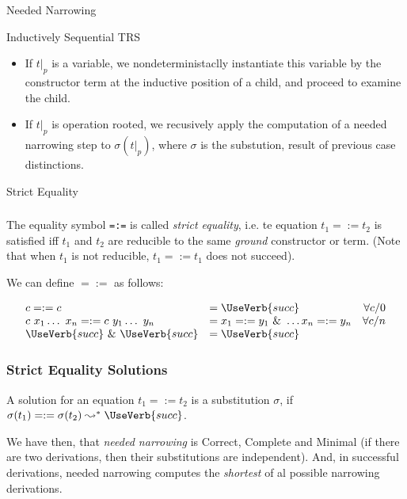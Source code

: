 \documentclass{beamer}
\begin{document}
\begin{section}{Needed Narrowing}
\begin{subsection}{Inductively Sequential TRS}
\begin{frame}
\begin{itemize}
\begin{itemize}
  \item If $t|_p$ is a variable, we nondeterministaclly instantiate this variable by the constructor term at the inductive position of a child, and proceed to examine the child.

  \item If $t|_p$ is operation rooted, we recusively apply the computation of a needed narrowing step to $\sigma(t|_p)$, where $\sigma$ is the substution, result of previous case distinctions.
  \end{itemize}
\end{itemize}

\end{frame}
\end{subsection}
\begin{subsection}{Strict Equality}
\begin{frame}[fragile]
\frametitle{\subsecname}
    The equality symbol \verb|=:=| is called \textit{strict equality}, i.e. te equation $t_1 =:= t_2$ is satisfied iff $t_1$ and $t_2$ are reducible to the same \textit{ground} constructor or term. (Note that when $t_1$ is not reducible, $t_1 =:= t_1$ does not succeed).

    We can define $=:=$ as follows:

    \[
    \begin{array}{llr}
    
      c =:= c &= \UseVerb{succ} &\forall  c/0\\
      c ~ x_1 \ldots ~ x_n =:= c ~ y_1 \ldots ~ y_n &= x_1 =:= y_1 ~\&~ \ldots x_n =:= y_n &\forall c/n \\
      \UseVerb{succ}~ \&~ \UseVerb{succ} &= \UseVerb{succ}
    \end{array}
    \]
\end{frame}

\begin{frame}[fragile]
\frametitle{Strict Equality Solutions}
A solution for an equation $t_1 =:= t_2$ is a substitution $\sigma$, if $\sigma(t_1) =:= \sigma(t_2) \leadsto^* \UseVerb{succ}$.

We have then, that \textit{needed narrowing} is Correct, Complete and Minimal (if there are two derivations, then their substitutions are independent). And, in successful derivations, needed narrowing computes the \textit{shortest} of al possible narrowing derivations.

\end{frame}
\end{subsection}


\end{section}
\end{document}
